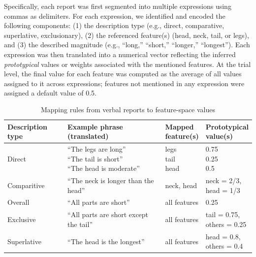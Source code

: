 Specifically, each report was first segmented into multiple expressions using commas as delimiters. For each expression, we identified and encoded the following components: (1) the description type (e.g., direct, comparative, superlative, exclusionary), (2) the referenced feature(s) (head, neck, tail, or legs), and (3) the described magnitude (e.g., “long,” “short,” “longer,” “longest”). Each expression was then translated into a numerical vector reflecting the inferred \textit{prototypical} values or weights associated with the mentioned features.  At the trial level, the final value for each feature was computed as the average of all values assigned to it across expressions; features not mentioned in any expression were assigned a default value of 0.5.


\begin{table}[htbp!]
\centering
\caption{Mapping rules from verbal reports to feature-space values}
\begin{tabularx}{\textwidth}{l X p{2.2cm} p{2cm}}
\toprule
\textbf{Description type} & \textbf{Example phrase (translated)} & \makecell[l]{\textbf{Mapped}\\ \textbf{feature(s)}} & \makecell[l]{\textbf{Prototypical}\\ \textbf{value(s)}} \\
\midrule
Direct & \makecell[l]{“The legs are long”\\ “The tail is short”\\ “The head is moderate”} & \makecell[l]{legs\\ tail\\ head} & \makecell[l]{0.75\\ 0.25\\ 0.5} \\
Comparitive & “The neck is longer than the head” & neck, head & \makecell[l]{neck = 2/3,\\ head = 1/3} \\
Overall & “All parts are short” & all features & 0.25 \\
Exclusive & “All parts are short except the tail” & all features & \makecell[l]{tail = 0.75,\\ others = 0.25} \\
Superlative & “The head is the longest” & all features & \makecell[l]{head = 0.8,\\ others = 0.4} \\

\bottomrule
\end{tabularx}
\label{tab:S1}
\end{table}
